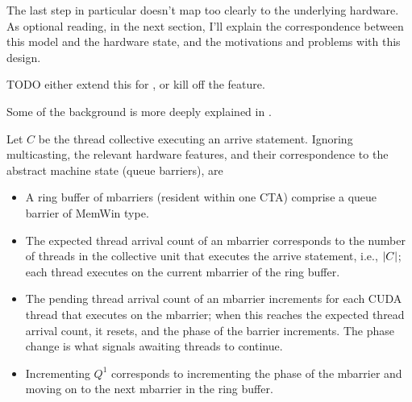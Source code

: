 \filbreak
The last step in particular doesn't map too clearly to the underlying hardware.
As optional reading, in the next section, I'll explain the correspondence between this model and the hardware state, and the motivations and problems with this design.

\filbreak
TODO either extend this for , or kill off the  feature.

\filbreak
{}

Some of the background is more deeply explained in .

Let $C$ be the thread collective executing an arrive statement.
Ignoring multicasting, the relevant hardware features, and their correspondence to the abstract machine state (queue barriers), are
\begin{itemize}
  \item A ring buffer of mbarriers (resident within one CTA) comprise a queue barrier of  MemWin type.
  \filbreak
  \item The expected thread arrival count of an mbarrier corresponds to the number of threads in the collective unit that executes the arrive statement, i.e., $\left \vert C \right\vert$; each thread executes  on the current mbarrier of the ring buffer.
  \filbreak
  \item The pending thread arrival count of an mbarrier increments for each CUDA thread that executes  on the mbarrier; when this reaches the expected thread arrival count, it resets, and the phase of the barrier increments.
  The phase change is what signals awaiting threads to continue.
  \filbreak
  \item Incrementing $Q^1$ corresponds to incrementing the phase of the mbarrier and moving on to the next mbarrier in the ring buffer.
\end{itemize}

